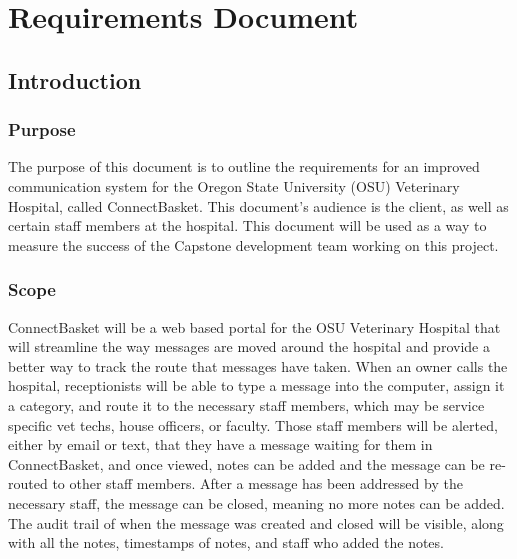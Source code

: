 \documentclass[onecolumn, draftclsnofoot,10pt, compsoc]{IEEEtran}
\begin{document}
\newpage
\section{Requirements Document}
\subsection{Introduction}

\subsubsection{Purpose}
The purpose of this document is to outline the requirements for an improved communication system for the Oregon State University (OSU) Veterinary Hospital, called ConnectBasket. 
This document's audience is the client, as well as certain staff members at the hospital. This document will be used as a way to measure the success of the Capstone development team working on this project. 


\subsubsection{Scope}
ConnectBasket will be a web based portal for the OSU Veterinary Hospital that will streamline the way messages are moved around the hospital and provide a better way to track the route that messages have taken. When an owner calls the hospital, receptionists will be able to type a message into the computer, assign it a category, and route it to the necessary staff members, which may be service specific vet techs, house officers, or faculty. Those staff members will be alerted, either by email or text, that they have a message waiting for them in ConnectBasket, and once viewed, notes can be added and the message can be re-routed to other staff members. After a message has been addressed by the necessary staff, the message can be closed, meaning no more notes can be added. The audit trail of when the message was created and closed will be visible, along with all the notes, timestamps of notes, and staff who added the notes.
\end{document}
